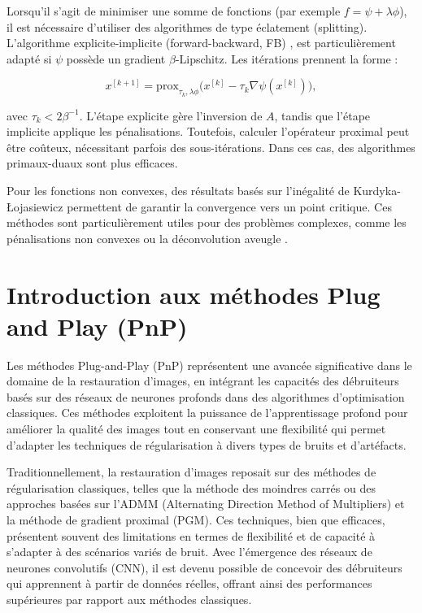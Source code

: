 \documentclass[a4paper, 12pt]{report} %
\begin{document}
Lorsqu’il s’agit de minimiser une somme de fonctions (par exemple \(f = \psi + \lambda \phi\)), il est nécessaire d’utiliser des algorithmes de type éclatement (splitting). L’algorithme explicite-implicite (forward-backward, FB) \cite{7}, est particulièrement adapté si \(\psi\) possède un gradient \(\beta\)-Lipschitz. Les itérations prennent la forme :

\[
x^{[k+1]} = \text{prox}_{\tau_k,\lambda \phi} \Big(x^{[k]} - \tau_k \nabla \psi(x^{[k]})\Big), \tag{7}
\]

avec \(\tau_k < 2\beta^{-1}\). L’étape explicite gère l’inversion de \(A\), tandis que l’étape implicite applique les pénalisations. Toutefois, calculer l’opérateur proximal peut être coûteux, nécessitant parfois des sous-itérations. Dans ces cas, des algorithmes primaux-duaux \cite{chambolle2016introduction} sont plus efficaces.

Pour les fonctions non convexes, des résultats basés sur l’inégalité de Kurdyka-Łojasiewicz permettent de garantir la convergence vers un point critique. Ces méthodes sont particulièrement utiles pour des problèmes complexes, comme les pénalisations non convexes ou la déconvolution aveugle \cite{chouzenoux2014variable}.

\section{Introduction aux méthodes Plug and Play (PnP)}
Les méthodes Plug-and-Play (PnP) représentent une avancée significative dans le domaine de la restauration d'images, en intégrant les capacités des débruiteurs basés sur des réseaux de neurones profonds dans des algorithmes d'optimisation classiques. Ces méthodes exploitent la puissance de l'apprentissage profond pour améliorer la qualité des images tout en conservant une flexibilité qui permet d'adapter les techniques de régularisation à divers types de bruits et d'artéfacts.


Traditionnellement, la restauration d'images reposait sur des méthodes de régularisation classiques, telles que la méthode des moindres carrés ou des approches basées sur l'ADMM (Alternating Direction Method of Multipliers) et la méthode de gradient proximal (PGM). Ces techniques, bien que efficaces, présentent souvent des limitations en termes de flexibilité et de capacité à s'adapter à des scénarios variés de bruit. Avec l'émergence des réseaux de neurones convolutifs (CNN), il est devenu possible de concevoir des débruiteurs qui apprennent à partir de données réelles, offrant ainsi des performances supérieures par rapport aux méthodes classiques.
\end{document}
